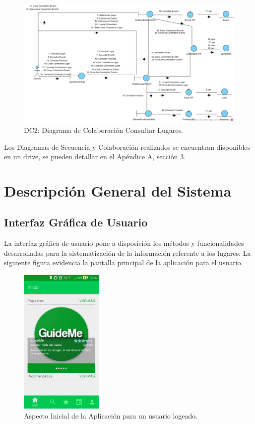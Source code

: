 \documentclass[12pt,letterpaper,openany]{book}
\begin{document}
\begin{figure}[H]
\begin{center}
\includegraphics[width=14cm]{./imagenes/DC/DC_consultar_lugar}
\caption{DC2: Diagrama de Colaboración Consultar Lugares.}
\end{center}
\end{figure}

Los Diagramas de Secuencia y Colaboración realizados se encuentran disponibles en un drive, se pueden detallar en el Apéndice A, sección 3.

\section{Descripción General del Sistema}
\subsection{Interfaz Gráfica de Usuario}
La interfaz gráfica de usuario pone a disposición los métodos y funcionalidades desarrolladas para la sistematización de la información referente a los lugares. La siguiente figura evidencia la pantalla principal de la aplicación para el usuario.

\begin{figure}[H]
\begin{center}
\includegraphics[width=4cm]{./imagenes/gui}
\caption{Aspecto Inicial de la Aplicación para un usuario logeado.}
\end{center}
\end{figure}
\end{document}
